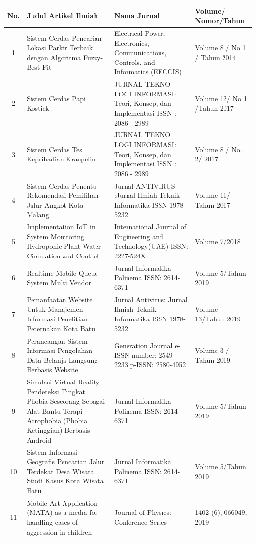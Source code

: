 {\footnotesize
\begin{longtable}{|c|p{5.5cm}|p{5cm}|p{3cm}|}
\hline
\textbf{No.} & \textbf{Judul Artikel Ilmiah} & \textbf{Nama Jurnal} & \textbf{Volume/ Nomor/Tahun} \\
\hline
1 & Sistem Cerdas Pencarian Lokasi Parkir Terbaik dengan Algoritma Fuzzy-Best Fit & Electrical Power, Electronics, Communications, Controls, and Informatics (EECCIS) & Volume 8 / No 1 / Tahun 2014 \\
\hline
2 & Sistem Cerdas Papi Kostick & JURNAL TEKNO LOGI INFORMASI: Teori, Konsep, dan Implementasi ISSN : 2086 - 2989 & Volume 12/ No 1 /Tahun 2017 \\
\hline
3 & Sistem Cerdas Tes Kepribadian Kraepelin & JURNAL TEKNO LOGI INFORMASI: Teori, Konsep, dan Implementasi ISSN : 2086 - 2989 & Volume 8 / No. 2/ 2017 \\
\hline
4 & Sistem Cerdas Penentu Rekomendasi Pemilihan Jalur Angkot Kota Malang & Jurnal ANTIVIRUS :Jurnal Ilmiah Teknik Informatika ISSN 1978-5232 & Volume 11/ Tahun 2017 \\
\hline
5 & Implementation IoT in System Monitoring Hydroponic Plant Water Circulation and Control & International Journal of Engineering and Technology(UAE) ISSN: 2227-524X & Volume 7/2018 \\
\hline
6 & Realtime Mobile Queue System Multi Vendor & Jurnal Informatika Polinema ISSN: 2614-6371 & Volume 5/Tahun 2019 \\
\hline
7 & Pemanfaatan Website Untuk Manajemen Informasi Penelitian Peternakan Kota Batu & Jurnal Antivirus: Jurnal Ilmiah Teknik Informatika ISSN 1978-5232 & Volume 13/Tahun 2019 \\
\hline
8 & Perancangan Sistem Informasi Pengolahan Data Belanja Langsung Berbasis Website & Generation Journal e-ISSN number: 2549-2233 p-ISSN: 2580-4952 & Volume 3 / Tahun 2019 \\
\hline
9 & Simulasi Virtual Reality Pendeteksi Tingkat Phobia Seseorang Sebagai Alat Bantu Terapi Acrophobia (Phobia Ketinggian) Berbasis Android & Jurnal Informatika Polinema ISSN: 2614-6371 & Volume 5/Tahun 2019 \\
\hline
10 & Sistem Informasi Geografis Pencarian Jalur Terdekat Desa Wisata Studi Kasus Kota Wisata Batu & Jurnal Informatika Polinema ISSN: 2614-6371 & Volume 5/Tahun 2019 \\
\hline
11 & Mobile Art Application (MATA) as a media for handling cases of aggression in children & Journal of Physics: Conference Series & 1402 (6), 066049, 2019 \\

\end{longtable}}
